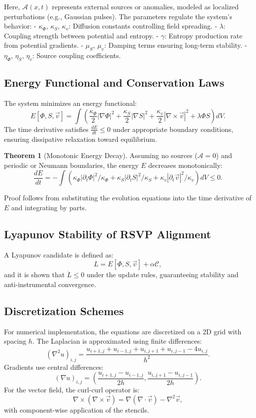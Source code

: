 \documentclass[12pt]{article}
\theoremstyle{definition}
\newtheorem{theorem}{Theorem}[section]
\begin{document}
Here, $\mathcal{A}(x,t)$ represents external sources or anomalies, modeled as localized perturbations (e.g., Gaussian pulses). The parameters regulate the system's behavior:
- $\kappa_\Phi$, $\kappa_S$, $\kappa_v$: Diffusion constants controlling field spreading.
- $\lambda$: Coupling strength between potential and entropy.
- $\gamma$: Entropy production rate from potential gradients.
- $\mu_S$, $\mu_v$: Damping terms ensuring long-term stability.
- $\eta_\Phi$, $\eta_S$, $\eta_v$: Source coupling coefficients.

\subsection{Energy Functional and Conservation Laws}
The system minimizes an energy functional:
\begin{equation}
E[\Phi, S, \vec{v}] = \int \left( \frac{\kappa_\Phi}{2} |\nabla \Phi|^2 + \frac{\kappa_S}{2} |\nabla S|^2 + \frac{\kappa_v}{2} |\nabla \times \vec{v}|^2 + \lambda \Phi S \right) dV.
\end{equation}
The time derivative satisfies $\frac{dE}{dt} \leq 0$ under appropriate boundary conditions, ensuring dissipative relaxation toward equilibrium.

\begin{theorem}[Monotonic Energy Decay]
Assuming no sources ($\mathcal{A} = 0$) and periodic or Neumann boundaries, the energy $E$ decreases monotonically:
\[
\frac{dE}{dt} = -\int \left( \kappa_\Phi |\partial_t \Phi|^2 / \kappa_\Phi + \kappa_S |\partial_t S|^2 / \kappa_S + \kappa_v |\partial_t \vec{v}|^2 / \kappa_v \right) dV \leq 0.
\]
\end{theorem}
Proof follows from substituting the evolution equations into the time derivative of $E$ and integrating by parts.

\subsection{Lyapunov Stability of RSVP Alignment}
A Lyapunov candidate is defined as:
\[
L = E[\Phi,S,\vec v] + \alpha \mathcal{C},
\]
and it is shown that $\dot{L} \le 0$ under the update rules, guaranteeing stability and anti-instrumental convergence.

\subsection{Discretization Schemes}
For numerical implementation, the equations are discretized on a 2D grid with spacing $h$. The Laplacian is approximated using finite differences:
\[
(\nabla^2 u)_{i,j} = \frac{u_{i+1,j} + u_{i-1,j} + u_{i,j+1} + u_{i,j-1} - 4u_{i,j}}{h^2}.
\]
Gradients use central differences:
\[
(\nabla u)_{i,j} = \left( \frac{u_{i+1,j} - u_{i-1,j}}{2h}, \frac{u_{i,j+1} - u_{i,j-1}}{2h} \right).
\]
For the vector field, the curl-curl operator is:
\[
\nabla \times (\nabla \times \vec{v}) = \nabla (\nabla \cdot \vec{v}) - \nabla^2 \vec{v},
\]
with component-wise application of the stencils.
\end{document}
